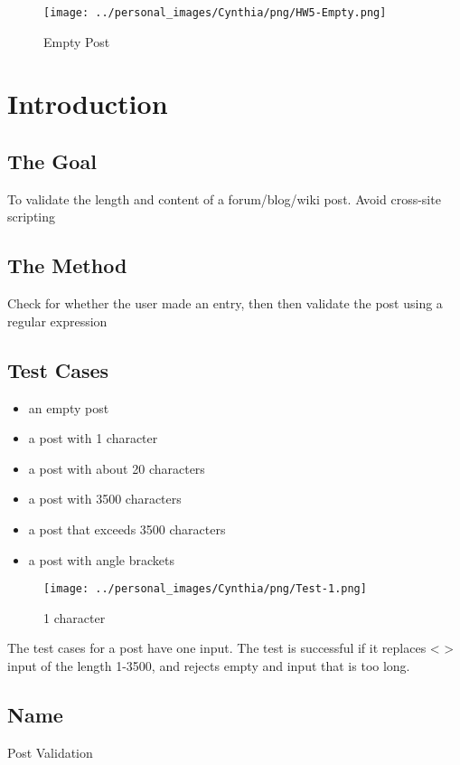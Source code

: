 \documentclass[12pt]{article}
\begin{document}
\begin{wrapfigure}[12]{r}{2.5in}
\begin{center}
	\texttt{[image: ../personal\_images/Cynthia/png/HW5-Empty.png]}
\caption{Empty Post}

\end{center}

\end{wrapfigure}

\section{Introduction}
\subsection{The Goal}
To validate the length and content of a forum/blog/wiki post. Avoid cross-site scripting
\subsection{The Method}
Check for whether the user made an entry, then then validate the post using a regular expression\\
\subsection{Test Cases}
\begin{itemize}
\item an empty post
\item a post with 1 character
\item a post with about 20 characters
\item a post with 3500 characters
\item a post that exceeds 3500 characters
\item a post with angle brackets
\end{itemize}
\begin{wrapfigure}[12]{r}{2.5in}
\begin{center}
	\texttt{[image: ../personal\_images/Cynthia/png/Test-1.png]}
\caption{1 character}

\end{center}

\end{wrapfigure}
The test cases for a post have one input. The test is successful if it replaces < >
input of the length 1-3500, and rejects empty and input that is too long.
\subsection{Name}
Post Validation
\end{document}
